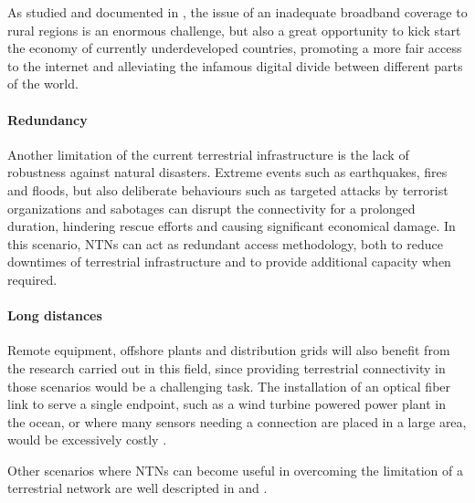 As studied and documented in \cite{6g-challenge-opportunity-base-pyramid}, the issue of an inadequate broadband coverage to rural regions is an enormous challenge, but also a great opportunity to kick start the economy of currently underdeveloped countries, promoting a more fair access to the internet and alleviating the infamous digital divide between different parts of the world.
\paragraph{Redundancy}
Another limitation of the current terrestrial infrastructure is the lack of robustness against natural disasters. Extreme events such as earthquakes, fires and floods, but also deliberate behaviours such as targeted attacks by terrorist organizations and sabotages can disrupt the connectivity for a prolonged duration, hindering rescue efforts and causing significant economical damage.
In this scenario, \ac{NTNs} can act as redundant access methodology, both to reduce downtimes of terrestrial infrastructure and to provide additional capacity when required. 

\paragraph{Long distances}
Remote equipment, offshore plants and distribution grids will also benefit from the research carried out in this field, since providing terrestrial connectivity in those scenarios would be a challenging task. The installation of an optical fiber link to serve a single endpoint, such as a wind turbine powered power plant in the ocean, or where many sensors needing a connection are placed in a large area, would be excessively costly \cite{performance-ntn-support-iot-wang}.

Other scenarios where \ac{NTNs} can become useful in overcoming the limitation of a terrestrial network are well descripted in \cite{ntn-6g-era-challenges-giordani} and \cite{potential-multilayered-nierarchical-ntn-wang}.

